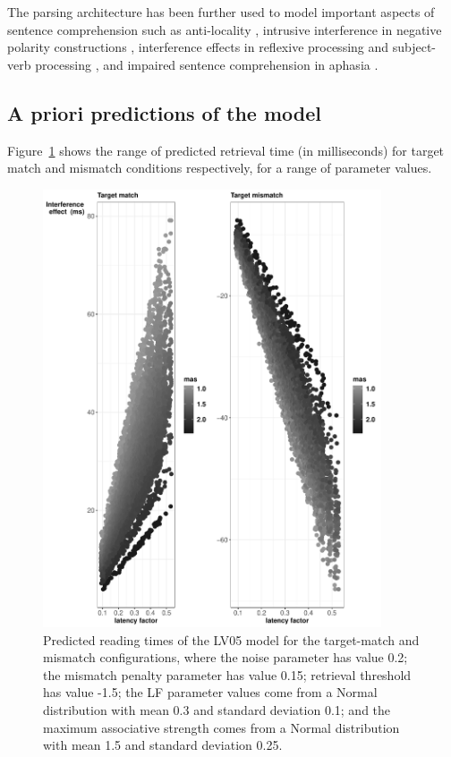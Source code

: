 \documentclass{cambridge7A}\usepackage[]{graphicx}\usepackage[]{color}
\begin{document}
The  parsing architecture has been further used to model important aspects of sentence comprehension such as  anti-locality \citep{VasishthLewis2006},  intrusive interference in negative polarity constructions \citep{VasishthBruessowLewis2008}, interference effects in reflexive processing \citep{PatilVasishthLewis2012,ParkerPhillips2014,JaegerEngelmannVasishth2015} and subject-verb processing
\citep{WagersLauPhillips2009,DillonMishlerSloggett2013}, and impaired sentence comprehension in aphasia \citep{PatilEtAl2016,MaetzigEtAltopics2018}.

\subsection{A priori predictions of the model} \label{lv05predictions}

Figure~\ref{fig:plotmatch} shows the range of predicted retrieval time (in milliseconds) for target match and mismatch conditions respectively, for a range of parameter values. 



\begin{figure}[!htbp]
\centering
\includegraphics[width=10cm]{figures/priorpredictions}
\caption{Predicted reading times of the LV05 model for the target-match and mismatch configurations, where the noise parameter has value 0.2; the mismatch penalty parameter has value 0.15; retrieval threshold has value -1.5;  the LF parameter values come from a Normal distribution with mean 0.3 and standard deviation 0.1; and the maximum associative strength comes from a Normal distribution with mean 1.5 and standard deviation 0.25.}\label{fig:plotmatch}
\end{figure}
\end{document}
